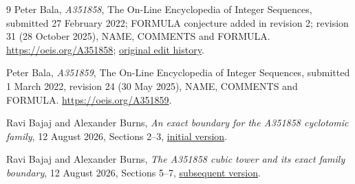 \documentclass[11pt]{article}
\begin{document}
\begin{thebibliography}{9}
Peter Bala, \emph{A351858}, The On-Line Encyclopedia of Integer Sequences,
submitted 27 February 2022; FORMULA conjecture added in revision 2;
revision 31 (28 October 2025), NAME, COMMENTS and FORMULA.
\url{https://oeis.org/A351858};
\href{https://oeis.org/history?seq=A351858\&start=20}{original edit history}.

Peter Bala, \emph{A351859}, The On-Line Encyclopedia of Integer Sequences,
submitted 1 March 2022, revision 24 (30 May 2025), NAME, COMMENTS and FORMULA.
\url{https://oeis.org/A351859}.

Ravi Bajaj and Alexander Burns,
\emph{An exact boundary for the A351858 cyclotomic family},
12 August 2026, Sections 2--3,
\href{https://github.com/rbajaj5/a183068-supercongruence/blob/524c02ec2a8da45b9fc7078e7de6f3a044360e82/related-results/A351858CyclotomicFamilyBoundary.md}{initial version}.

Ravi Bajaj and Alexander Burns,
\emph{The A351858 cubic tower and its exact family boundary},
12 August 2026, Sections 5--7,
\href{https://github.com/rbajaj5/a183068-supercongruence/blob/dd9762d8cdf9718ecc09637dc470e87100677886/related-results/A351858CyclotomicFamilyBoundary.md}{subsequent version}.
\end{thebibliography}
\end{document}
